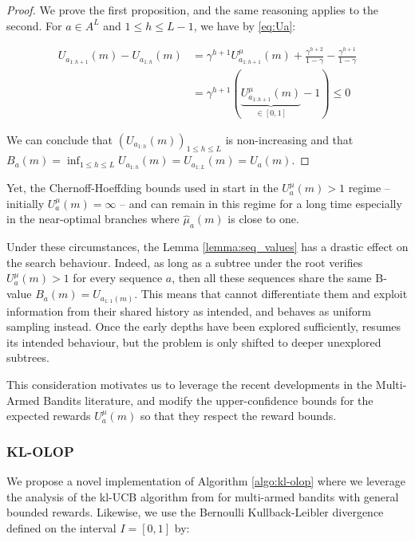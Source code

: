 \begin{proof}
	We prove the first proposition, and the same reasoning applies to the second. For $a\in A^L$ and $1 \leq h \leq L - 1$, we have by \eqref{eq:Ua}:
	
	
	\begin{align*}
	U_{a_{1:h+1}}(m) - U_{a_{1:h}}(m) &= \gamma^{h+1}U^{\mu}_{a_{1:h+1}}(m) + \frac{\gamma^{h+2}}{1-\gamma} - \frac{\gamma^{h+1}}{1-\gamma}\\
	&= \gamma^{h+1}(\underbrace{U^{\mu}_{a_{1:h+1}}(m)}_{\in [0, 1]} - 1) \leq 0
	\end{align*}
	
	
	\noindent
	We can conclude that $(U_{a_{1:h}}(m))_{1\leq h \leq L}$ is non-increasing and that $B_a(m) = \inf_{1 \leq h \leq L} U_{a_{1:h}}(m) = U_{a_{1:L}}(m) = U_a(m)$.
\end{proof}

Yet, the Chernoff-Hoeffding bounds used in \OLOP start in the $U^{\mu}_a(m) > 1$ regime -- initially $U^{\mu}_a(m) = \infty$ -- and can remain in this regime for a long time especially in the near-optimal branches where $\hat{\mu}_a(m)$ is close to one.

Under these circumstances, the Lemma \ref{lemma:seq_values} has a drastic effect on the search behaviour. Indeed, as long as a subtree under the root verifies $U^{\mu}_a(m) > 1$ for every sequence $a$, then all these sequences share the same B-value $B_a(m) = U_{a_{1:1}(m)}$. This means that \OLOP cannot differentiate them and exploit information from their shared history as intended, and behaves as uniform sampling instead.
Once the early depths have been explored sufficiently, \OLOP resumes its intended behaviour, but the problem is only shifted to deeper unexplored subtrees.

This consideration motivates us to leverage the recent developments in the Multi-Armed Bandits literature, and modify the upper-confidence bounds for the expected rewards $U^\mu_a(m)$ so that they respect the reward bounds.


\subsubsection{KL-OLOP}
\label{sec:kl-olop-kl-olop}

\noindent
We propose a novel implementation of Algorithm \ref{algo:kl-olop} where we leverage the analysis of the kl-UCB algorithm from \citep{Cappe2013} for multi-armed bandits with general bounded rewards.
Likewise, we use the Bernoulli Kullback-Leibler divergence defined on the interval $I=[0,1]$ by:

